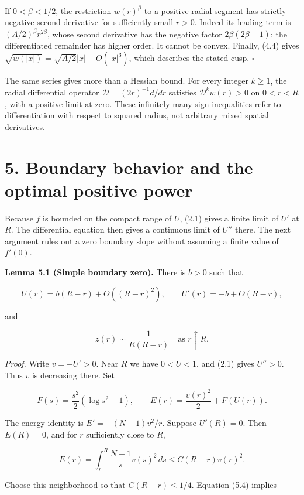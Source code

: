 \documentclass[11pt]{article}
\begin{document}
If \(0<\beta<1/2\), the restriction \(w(r)^\beta\) to a positive radial
segment has strictly negative second derivative for sufficiently small
\(r>0\). Indeed its leading term is \((A/2)^\beta r^{2\beta}\), whose
second derivative has the negative factor \(2\beta(2\beta-1)\); the
differentiated remainder has higher order. It cannot be convex. Finally,
(4.4) gives \(\sqrt{w(|x|)}=\sqrt{A/2}|x|+O(|x|^3)\), which describes
the stated cusp. \(\square\)

The same series gives more than a Hessian bound. For every integer
\(k\geq1\), the radial differential operator
\(\mathcal D=(2r)^{-1}d/dr\) satisfies \(\mathcal D^k w(r)>0\) on
\(0<r<R\), with a positive limit at zero. These infinitely many sign
inequalities refer to differentiation with respect to squared radius,
not arbitrary mixed spatial derivatives.

\section{5. Boundary behavior and the optimal positive
power}\label{boundary-behavior-and-the-optimal-positive-power}

Because \(f\) is bounded on the compact range of \(U\), (2.1) gives a
finite limit of \(U'\) at \(R\). The differential equation then gives a
continuous limit of \(U''\) there. The next argument rules out a zero
boundary slope without assuming a finite value of \(f'(0)\).

\textbf{Lemma 5.1 (Simple boundary zero).} There is \(b>0\) such that

\[
U(r)=b(R-r)+O((R-r)^2),\qquad
U'(r)=-b+O(R-r),
\tag{5.1}
\]

and

\[
z(r)\sim\frac{1}{R(R-r)}\quad\text{as }r\uparrow R.
\tag{5.2}
\]

\emph{Proof.} Write \(v=-U'>0\). Near \(R\) we have \(0<U<1\), and (2.1)
gives \(U''>0\). Thus \(v\) is decreasing there. Set

\[
F(s)=\frac{s^2}{2}(\log s^2-1),\qquad
E(r)=\frac{v(r)^2}{2}+F(U(r)).
\tag{5.3}
\]

The energy identity is \(E'=-(N-1)v^2/r\). Suppose \(U'(R)=0\). Then
\(E(R)=0\), and for \(r\) sufficiently close to \(R\),

\[
E(r)=\int_r^R\frac{N-1}{s}v(s)^2\,ds
\leq C(R-r)v(r)^2.
\tag{5.4}
\]

Choose this neighborhood so that \(C(R-r)\leq1/4\). Equation (5.4)
implies
\end{document}
